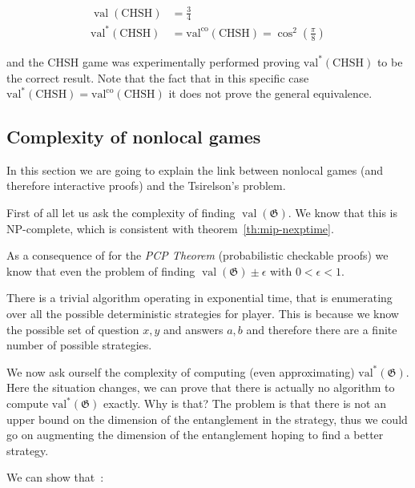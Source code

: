  \begin{align}
    \operatorname{val}(\text{CHSH}) &= \frac{3}{4} \\
    \operatorname{val^{*}}(\text{CHSH}) &= \operatorname{val^{co}}(\text{CHSH}) = \cos^2\left(\frac{\pi}{8}\right) 
 \end{align}

 and the CHSH game was experimentally performed proving $\operatorname{val^{*}}(\text{CHSH})$ to be the correct result.
Note that the fact that in this specific case $\operatorname{val^{*}}(\text{CHSH}) = \operatorname{val^{co}}(\text{CHSH}) $ it does not prove the general equivalence.

\subsection{Complexity of nonlocal games}
In this section we are going to explain the link between nonlocal games (and therefore interactive proofs) and the Tsirelson's problem.

First of all let us ask the complexity of finding $\operatorname{val}(\mathfrak{G})$. 
We know that this is NP-complete, which is consistent with theorem~\ref{th:mip-nexptime}. 

As a consequence of for the \emph{PCP Theorem} (probabilistic checkable proofs) we know that even the problem of finding $\operatorname{val}(\mathfrak{G}) \pm \epsilon$ with $ 0 < \epsilon < 1$.

There is a trivial algorithm operating in exponential time, that is enumerating over all the possible deterministic strategies for player. This is because we know the possible set of question $x,y$ and answers $a,b$ and therefore there are a finite number of possible strategies.

We now ask ourself the complexity of computing (even approximating) $\operatorname{val^{*}}(\mathfrak{G})$. Here the situation changes, we can prove that there is actually no algorithm to compute $\operatorname{val^{*}}(\mathfrak{G})$ exactly. Why is that? The problem is that there is not an upper bound on the dimension of the entanglement in the strategy, thus we could go on augmenting the dimension of the entanglement hoping to find a better strategy.



We can show that~\cite{mipre}:

